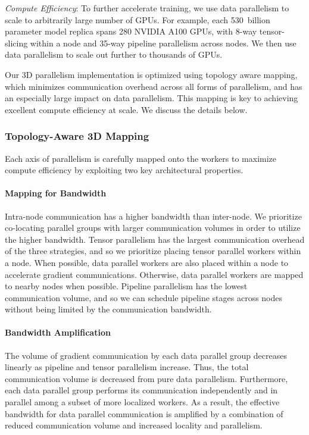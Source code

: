 \documentclass[11pt]{article}
\begin{document}
\textit{Compute Efficiency}: To further accelerate training,
we use data parallelism to scale to arbitrarily large number of GPUs.
For example, each 530~billion parameter model replica spans 280 NVIDIA A100 GPUs, with 8-way
tensor-slicing within a node and 35-way pipeline parallelism across nodes.
We then use data parallelism to scale out further to thousands of GPUs.

Our 3D parallelism implementation is optimized using topology aware mapping,
which minimizes communication overhead across all forms of parallelism, and has an  especially large impact on data parallelism. This mapping is key to achieving excellent
compute efficiency at scale. We discuss the details below.

\subsubsection{Topology-Aware 3D Mapping} 

Each axis of parallelism is carefully mapped onto the workers to maximize
compute efficiency by exploiting two key architectural properties.

\paragraph{Mapping for Bandwidth}
Intra-node communication has a higher bandwidth than inter-node.
We prioritize co-locating parallel groups with larger communication volumes
in order to utilize the higher bandwidth.
Tensor parallelism has the largest communication overhead of the three strategies,
and so we prioritize placing tensor parallel workers within a node.
When possible, data parallel workers are also placed
within a node to accelerate gradient communications. Otherwise, data parallel workers
are mapped to nearby nodes when possible.
Pipeline parallelism has the lowest communication volume, and so we can schedule pipeline
stages across nodes without being limited by the communication bandwidth.


\paragraph{Bandwidth Amplification}
The volume of gradient communication by each data parallel group decreases linearly
as pipeline and tensor parallelism increase. Thus, the total communication volume is
decreased from pure data parallelism. Furthermore, each data parallel group
performs its communication independently and in parallel among a subset of more
localized workers. As a result, the effective bandwidth for data parallel
communication is amplified by a combination of reduced communication volume and
increased locality and parallelism.
\end{document}
